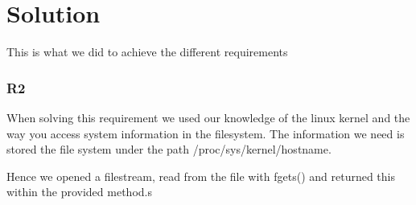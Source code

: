 \chapter{Solution}
This is what we did to achieve the different requirements

\subsection{R2}
When solving this requirement we used our knowledge of the linux kernel and the way you access system information in the filesystem. The information we need is stored the file system under the path /proc/sys/kernel/hostname.

Hence we opened a filestream, read from the file with fgets() and returned this within the provided method.s